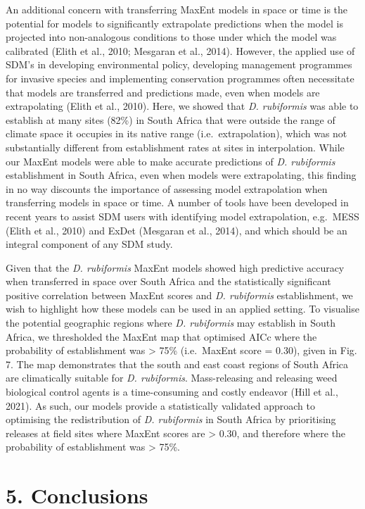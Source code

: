 \documentclass[12pt,]{article}
\begin{document}
An additional concern with transferring MaxEnt models in space or time
is the potential for models to significantly extrapolate predictions
when the model is projected into non-analogous conditions to those under
which the model was calibrated (Elith et al., 2010; Mesgaran et al.,
2014). However, the applied use of SDM's in developing environmental
policy, developing management programmes for invasive species and
implementing conservation programmes often necessitate that models are
transferred and predictions made, even when models are extrapolating
(Elith et al., 2010). Here, we showed that \emph{D. rubiformis} was able
to establish at many sites (82\%) in South Africa that were outside the
range of climate space it occupies in its native range
(i.e.~extrapolation), which was not substantially different from
establishment rates at sites in interpolation. While our MaxEnt models
were able to make accurate predictions of \emph{D. rubiformis}
establishment in South Africa, even when models were extrapolating, this
finding in no way discounts the importance of assessing model
extrapolation when transferring models in space or time. A number of
tools have been developed in recent years to assist SDM users with
identifying model extrapolation, e.g.~MESS (Elith et al., 2010) and
ExDet (Mesgaran et al., 2014), and which should be an integral component
of any SDM study.

Given that the \emph{D. rubiformis} MaxEnt models showed high predictive
accuracy when transferred in space over South Africa and the
statistically significant positive correlation between MaxEnt scores and
\emph{D. rubiformis} establishment, we wish to highlight how these
models can be used in an applied setting. To visualise the potential
geographic regions where \emph{D. rubiformis} may establish in South
Africa, we thresholded the MaxEnt map that optimised AICc where the
probability of establishment was \textgreater{} 75\% (i.e.~MaxEnt score
= 0.30), given in Fig. 7. The map demonstrates that the south and east
coast regions of South Africa are climatically suitable for \emph{D.
rubiformis}. Mass-releasing and releasing weed biological control agents
is a time-consuming and costly endeavor (Hill et al., 2021). As such,
our models provide a statistically validated approach to optimising the
redistribution of \emph{D. rubiformis} in South Africa by prioritising
releases at field sites where MaxEnt scores are \textgreater{} 0.30, and
therefore where the probability of establishment was \textgreater{}
75\%.

\hypertarget{conclusions}{%
\section{5. Conclusions}\label{conclusions}}
\end{document}
